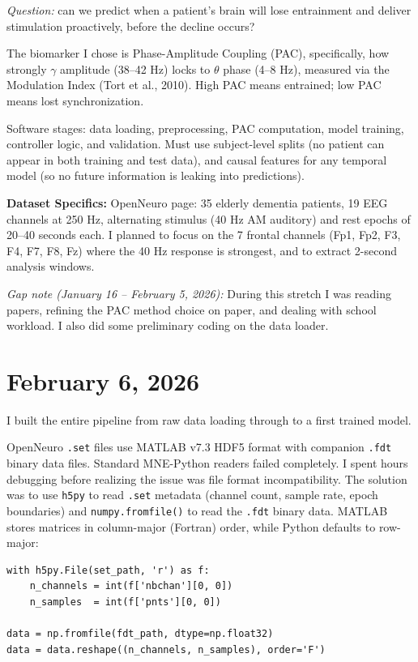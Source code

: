 \documentclass[11pt,letterpaper]{article}
\begin{document}
\textit{Question:} can we predict when a patient's brain will lose entrainment and deliver
stimulation proactively, before the decline occurs?

The biomarker I chose is Phase-Amplitude Coupling (PAC), specifically, how strongly $\gamma$
amplitude (38--42 Hz) locks to $\theta$ phase (4--8 Hz), measured via the Modulation Index
(Tort et al., 2010). High PAC means entrained; low PAC means lost synchronization.

Software stages: data loading, preprocessing, PAC computation, model training, controller logic,
and validation. Must use subject-level splits (no patient can appear in both training and test
data), and causal features for any temporal model (so no future information is leaking into
predictions).

\textbf{Dataset Specifics:} OpenNeuro page: 35 elderly dementia patients, 19 EEG channels at
250 Hz, alternating stimulus (40 Hz AM auditory) and rest epochs of 20--40 seconds each. I
planned to focus on the 7 frontal channels (Fp1, Fp2, F3, F4, F7, F8, Fz) where the 40 Hz
response is strongest, and to extract 2-second analysis windows.

\textit{Gap note (January 16 -- February 5, 2026):} During this stretch I was reading papers,
refining the PAC method choice on paper, and dealing with school workload. I also did some
preliminary coding on the data loader.

\section*{February 6, 2026}

I built the entire pipeline from raw data loading through to a first trained model.

OpenNeuro \texttt{.set} files use MATLAB v7.3 HDF5 format with companion \texttt{.fdt} binary
data files. Standard MNE-Python readers failed completely. I spent hours debugging before
realizing the issue was file format incompatibility. The solution was to use \texttt{h5py} to
read \texttt{.set} metadata (channel count, sample rate, epoch boundaries) and
\texttt{numpy.fromfile()} to read the \texttt{.fdt} binary data. MATLAB stores matrices in
column-major (Fortran) order, while Python defaults to row-major:

\begin{verbatim}
with h5py.File(set_path, 'r') as f:
    n_channels = int(f['nbchan'][0, 0])
    n_samples  = int(f['pnts'][0, 0])

data = np.fromfile(fdt_path, dtype=np.float32)
data = data.reshape((n_channels, n_samples), order='F')
\end{verbatim}
\end{document}
